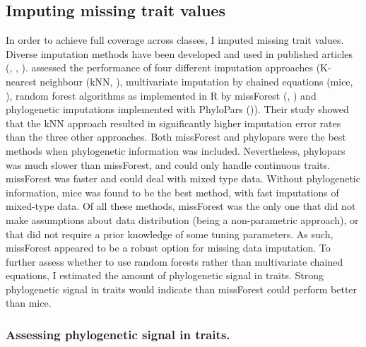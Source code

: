 \subsection{Imputing missing trait values}
In order to achieve full coverage across classes, I imputed missing trait values. Diverse imputation methods have been developed and used in published articles (\cite{Cooke2019}, \cite{Molina-Venegas2018a}, \cite{Swenson2014}). \cite{Penone2014} assessed the performance of four different imputation approaches (K-nearest neighbour (kNN, \cite{Troyanskaya2001}), multivariate imputation by chained equations (mice, \cite{mice}), random forest algorithms as implemented in R by missForest (\cite{Stekhoven2012}, \cite{Stekhoven2016}) and phylogenetic imputations implemented with PhyloPars (\cite{Bruggeman2009})). Their study showed that the kNN approach resulted in significantly higher imputation error rates than the three other approaches. Both missForest and phylopars were the best methods when phylogenetic information was included. Nevertheless, phylopars was much slower than missForest, and could only handle continuous traits. missForest was faster and could deal with mixed type data. Without phylogenetic information, mice was found to be the best method, with fast imputations of mixed-type data. Of all these methods, missForest was the only one that did not make assumptions about data distribution (being a non-parametric approach), or that did not require a prior knowledge of some tuning parameters. As such, missForest appeared to be a robust option for missing data imputation. To further assess whether to use random forests rather than multivariate chained equations, I estimated the amount of phylogenetic signal in traits. Strong phylogenetic signal in traits would indicate than missForest could perform better than mice.

\subsubsection{Assessing phylogenetic signal in traits.}

